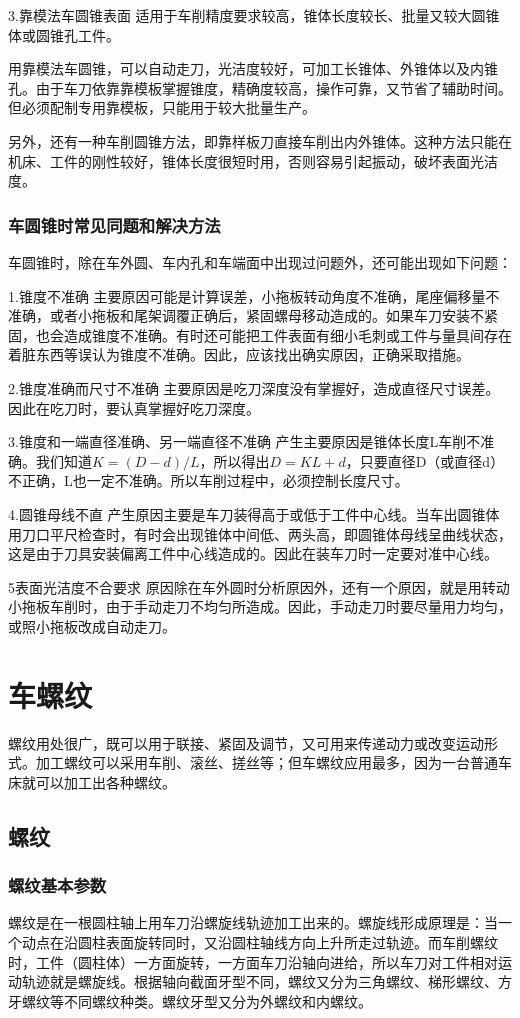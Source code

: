 \documentclass{ctexbook}
\begin{document}
3.靠模法车圆锥表面 适用于车削精度要求较高，锥体长度较长、批量又较大圆锥体或圆锥孔工件。

用靠模法车圆锥，可以自动走刀，光洁度较好，可加工长锥体、外锥体以及内锥孔。由于车刀依靠靠模板掌握锥度，精确度较高，操作可靠，又节省了辅助时间。但必须配制专用靠模板，只能用于较大批量生产。

另外，还有一种车削圆锥方法，即靠样板刀直接车削出内外锥体。这种方法只能在机床、工件的刚性较好，锥体长度很短时用，否则容易引起振动，破坏表面光洁度。
\subsubsection{车圆锥时常见同题和解决方法}
车圆锥时，除在车外圆、车内孔和车端面中出现过问题外，还可能出现如下问题：

1.锥度不准确 主要原因可能是计算误差，小拖板转动角度不准确，尾座偏移量不准确，或者小拖板和尾架调覆正确后，紧固螺母移动造成的。如果车刀安装不紧固，也会造成锥度不准确。有时还可能把工件表面有细小毛刺或工件与量具间存在着脏东西等误认为锥度不准确。因此，应该找出确实原因，正确采取措施。

2.锥度准确而尺寸不准确 主要原因是吃刀深度没有掌握好，造成直径尺寸误差。因此在吃刀时，要认真掌握好吃刀深度。

3.锥度和一端直径准确、另一端直径不准确 产生主要原因是锥体长度L车削不准确。我们知道$K=(D-d)/L$，所以得出$D=KL+d$，只要直径D（或直径d）不正确，L也一定不准确。所以车削过程中，必须控制长度尺寸。

4.圆锥母线不直 产生原因主要是车刀装得高于或低于工件中心线。当车出圆锥体用刀口平尺检查时，有时会出现锥体中间低、两头高，即圆锥体母线呈曲线状态，这是由于刀具安装偏离工件中心线造成的。因此在装车刀时一定要对准中心线。

5表面光洁度不合要求 原因除在车外圆时分析原因外，还有一个原因，就是用转动小拖板车削时，由于手动走刀不均匀所造成。因此，手动走刀时要尽量用力均匀，或照小拖板改成自动走刀。
\section{车螺纹}
螺纹用处很广，既可以用于联接、紧固及调节，又可用来传递动力或改变运动形式。加工螺纹可以采用车削、滚丝、搓丝等；但车螺纹应用最多，因为一台普通车床就可以加工出各种螺纹。
\subsection{螺纹}
\subsubsection{螺纹基本参数}
螺纹是在一根圆柱轴上用车刀沿螺旋线轨迹加工出来的。螺旋线形成原理是：当一个动点在沿圆柱表面旋转同时，又沿圆柱轴线方向上升所走过轨迹。而车削螺纹时，工件（圆柱体）一方面旋转，一方面车刀沿轴向进给，所以车刀对工件相对运动轨迹就是螺旋线。根据轴向截面牙型不同，螺纹又分为三角螺纹、梯形螺纹、方牙螺纹等不同螺纹种类。螺纹牙型又分为外螺纹和内螺纹。
\end{document}
